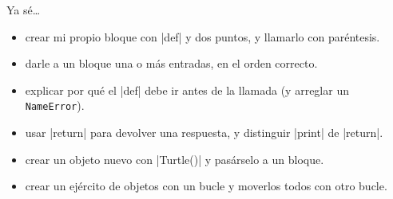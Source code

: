 Ya sé\ldots
\begin{itemize}[label={}, leftmargin=0pt]
  \item \tick crear mi propio bloque con \py|def| y dos puntos, y llamarlo con paréntesis.
  \item \tick darle a un bloque una o más entradas, en el orden correcto.
  \item \tick explicar por qué el \py|def| debe ir antes de la llamada (y arreglar un \texttt{NameError}).
  \item \tick usar \py|return| para devolver una respuesta, y distinguir \py|print| de \py|return|.
  \item \tick crear un objeto nuevo con \py|Turtle()| y pasárselo a un bloque.
  \item \tick crear un ejército de objetos con un bucle y moverlos todos con otro bucle.
\end{itemize}
